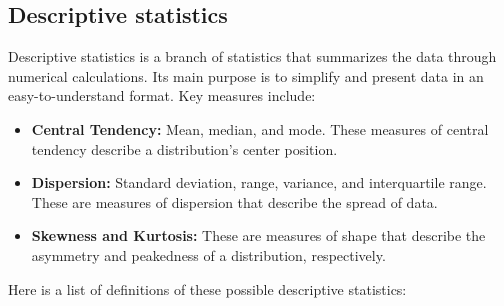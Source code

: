 \subsection{Descriptive statistics}
\label{subsec:statistics}
Descriptive statistics is a branch of statistics that summarizes the data through numerical calculations. Its main purpose is to simplify and present data in an easy-to-understand format. Key measures include:

\begin{itemize}
\item \textbf{Central Tendency:} Mean, median, and mode. These measures of central tendency describe a distribution's center position.
\item \textbf{Dispersion:} Standard deviation, range, variance, and interquartile range. These are measures of dispersion that describe the spread of data.
\item \textbf{Skewness and Kurtosis:} These are measures of shape that describe the asymmetry and peakedness of a distribution, respectively.
\end{itemize}

Here is a list of definitions of these possible descriptive statistics:

